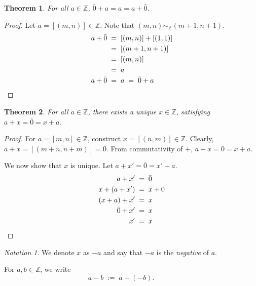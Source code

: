 \documentclass[10pt]{article}
\newtheorem{theorem}{Theorem}[section]
\theoremstyle{definition}
\theoremstyle{remark}
\newtheorem*{notation}{Notation}
\begin{document}
        \begin{theorem}
                For all $a \in \mathbb{Z}$, $\bar{0} + a = a = a + \bar{0}$.
        \end{theorem}
        \begin{proof}
                Let $a = [(m, n)] \in \mathbb{Z}$. Note that $(m, n) \sim_{\mathbb{Z}} (m + 1, n + 1)$.
                \begin{align*}
                        a + \bar{0} \;&=\; [(m, n)] + [(1, 1)] \\
                                \;&=\; [(m + 1, n + 1)] \\
                                \;&=\; [(m, n)] \\
                                \;&=\; a \\
                        a + \bar{0} \;&=\; a \;=\; \bar{0} + a \qedhere
                \end{align*}
        \end{proof}
        
        \begin{theorem}
                        For all $a \in \mathbb{Z}$, there exists a unique $x \in \mathbb{Z}$, satisfying $a + x = \bar{0} = x + a$.
        \end{theorem}
        \begin{proof}
                For $a = [m, n] \in \mathbb{Z}$, construct $x = [(n, m)] \in \mathbb{Z}$.
                Clearly, $a + x = [(m + n, n + m)] = \bar{0}$.
                From commutativity of $+$, $a + x = \bar{0} = x + a$.

                We now show that $x$ is unique. Let $a + x' = \bar{0} = x' + a$.
                \begin{align*}
                        a + x' \;&=\; \bar{0} \\
                        x + (a + x') \;&=\; x + \bar{0} \\
                        (x + a) + x' \;&=\; x \\
                        \bar{0} + x' \;&=\; x \\
                        x' \;&=\; x     \qedhere
                \end{align*}
        \end{proof}
        \begin{notation}
                We denote $x$ as $-a$ and say that $-a$ is the \textit{negative} of $a$.

                For $a, b \in \mathbb{Z}$, we write
                \[
                a - b \;:=\; a + (-b).\quad\quad\quad
                \]
        \end{notation}
\end{document}
